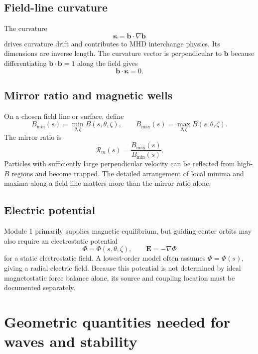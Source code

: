 \subsection{Field-line curvature}
The curvature
\begin{equation}
\boldsymbol\kappa=\mathbf b\cdot\nabla\mathbf b
\end{equation}
drives curvature drift and contributes to MHD interchange physics. Its dimensions are inverse length. The curvature vector is perpendicular to $\mathbf b$ because differentiating $\mathbf b\cdot\mathbf b=1$ along the field gives
\begin{equation}
\mathbf b\cdot\boldsymbol\kappa=0.
\end{equation}

\subsection{Mirror ratio and magnetic wells}
On a chosen field line or surface, define
\begin{equation}
B_{\min}(s)=\min_{\theta,\zeta}B(s,\theta,\zeta),
\qquad
B_{\max}(s)=\max_{\theta,\zeta}B(s,\theta,\zeta).
\end{equation}
The mirror ratio is
\begin{equation}
\mathcal R_m(s)=\frac{B_{\max}(s)}{B_{\min}(s)}.
\end{equation}
Particles with sufficiently large perpendicular velocity can be reflected from high-$B$ regions and become trapped. The detailed arrangement of local minima and maxima along a field line matters more than the mirror ratio alone.

\subsection{Electric potential}
Module 1 primarily supplies magnetic equilibrium, but guiding-center orbits may also require an electrostatic potential
\begin{equation}
\Phi=\Phi(s,\theta,\zeta),
\qquad
\mathbf E=-\nabla\Phi
\end{equation}
for a static electrostatic field. A lowest-order model often assumes $\Phi=\Phi(s)$, giving a radial electric field. Because this potential is not determined by ideal magnetostatic force balance alone, its source and coupling location must be documented separately.

\section{Geometric quantities needed for waves and stability}
\label{sec:wave_geometry}

